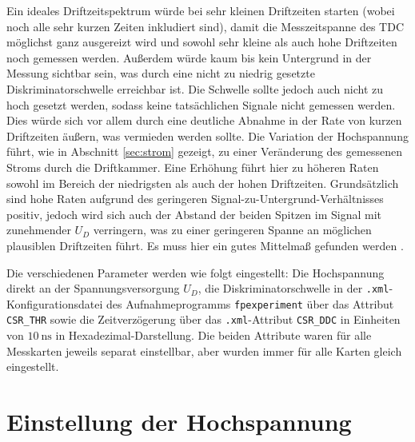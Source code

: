 Ein ideales Driftzeitspektrum würde bei sehr kleinen Driftzeiten starten (wobei noch alle sehr kurzen Zeiten inkludiert sind), damit die Messzeitspanne des TDC möglichst ganz ausgereizt wird und sowohl sehr kleine als auch hohe Driftzeiten noch gemessen werden. Außerdem würde kaum bis kein Untergrund in der Messung sichtbar sein, was durch eine nicht zu niedrig gesetzte Diskriminatorschwelle erreichbar ist. Die Schwelle sollte jedoch auch nicht zu hoch gesetzt werden, sodass keine tatsächlichen Signale nicht gemessen werden. Dies würde sich vor allem durch eine deutliche Abnahme in der Rate von kurzen Driftzeiten äußern, was vermieden werden sollte. Die Variation der Hochspannung führt, wie in Abschnitt \ref{sec:strom} gezeigt, zu einer Veränderung des gemessenen Stroms durch die Driftkammer. Eine Erhöhung führt hier zu höheren Raten sowohl im Bereich der niedrigsten als auch der hohen Driftzeiten. Grundsätzlich sind hohe Raten aufgrund des geringeren Signal-zu-Untergrund-Verhältnisses positiv, jedoch wird sich auch der Abstand der beiden Spitzen im Signal mit zunehmender $U_D$ verringern, was zu einer geringeren Spanne an möglichen plausiblen Driftzeiten führt. Es muss hier ein gutes Mittelmaß gefunden werden \cite[34-36]{hammanndiplom}.

Die verschiedenen Parameter werden wie folgt eingestellt: Die Hochspannung direkt an der Spannungsversorgung $U_D$, die Diskriminatorschwelle in der \texttt{.xml}-Konfigurationsdatei des Aufnahmeprogramms \texttt{fpexperiment} über das Attribut \texttt{CSR\_THR} sowie die Zeitverzögerung über das \texttt{.xml}-Attribut \texttt{CSR\_DDC} in Einheiten von $\SI{10}{\nano\s}$ in Hexadezimal-Darstellung. Die beiden Attribute waren für alle Messkarten jeweils separat einstellbar, aber wurden immer für alle Karten gleich eingestellt.

\section{Einstellung der Hochspannung} \label{sec:hochspannnung_bp}



